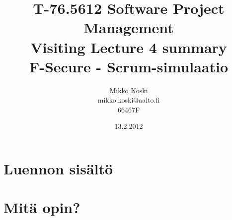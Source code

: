\documentclass[a4paper]{article}
\begin{document}
\title{\small T-76.5612 Software Project Management \\ Visiting Lecture 4 summary \\ \huge F-Secure - Scrum-simulaatio}
\date{13.2.2012}
\author{Mikko Koski \\ mikko.koski@aalto.fi \\ 66467F}
\maketitle

\normalsize

\section{Luennon sisältö}

\section{Mitä opin?}
\end{document}
